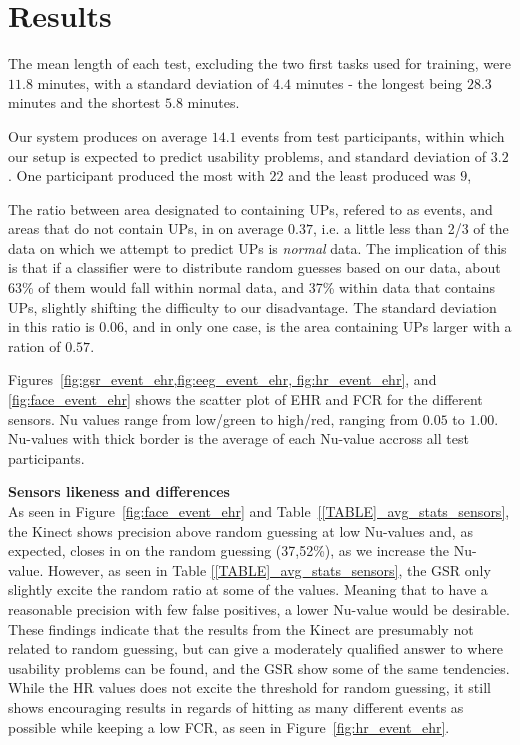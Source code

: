 \section{Results}
The mean length of each test, excluding the two first tasks used for training, were $11.8$ minutes, with a standard
deviation of $4.4$ minutes - the longest being $28.3$ minutes and the shortest $5.8$ minutes.

Our system produces on average $14.1$ events from test participants, within which our setup is expected to predict
usability problems, and standard deviation of $3.2$. One participant produced the most with $22$ and the least produced
was $9$,

The ratio between area designated to containing UPs, refered to as events, and areas that do not contain UPs, in on
average $0.37$, i.e. a little less than 2/3 of the data on which we attempt to predict UPs is \textit{normal} data. The
implication of this is that if a classifier were to distribute random guesses based on our data, about 63\% of them
would fall within normal data, and 37\% within data that contains UPs, slightly shifting the difficulty to our
disadvantage. The standard deviation in this ratio is $0.06$, and in only one case, is the area containing UPs larger
with a ration of $0.57$.




Figures~\ref{fig:gsr_event_ehr,fig:eeg_event_ehr, fig:hr_event_ehr}, and \ref{fig:face_event_ehr} shows the scatter plot
of EHR and FCR for the different sensors. Nu values range from low/green to high/red, ranging from $0.05$ to $1.00$.
Nu-values with thick border is the average of each Nu-value accross all test participants.

\textbf{Sensors likeness and differences}\\



As seen in Figure~\ref{fig:face_event_ehr} and Table~\ref{[TABLE]_avg_stats_sensors}, the Kinect shows precision above random guessing at low Nu-values and,
as expected, closes in on the random guessing (37,52\%), as we increase the Nu-value. However, as seen in Table
\ref{[TABLE]_avg_stats_sensors}, the GSR only slightly excite the random ratio at some of the values. Meaning that
to have a reasonable precision with few false positives, a lower Nu-value would be desirable.
These findings indicate that the results from the Kinect are presumably not related to random guessing, but can give a moderately qualified answer to where usability problems can be found, and the GSR show some of the same tendencies.
While the HR values does not excite the threshold for random guessing, it still shows encouraging results in regards of hitting as many different events as possible while keeping a low FCR, as seen in Figure~\ref{fig:hr_event_ehr}.

